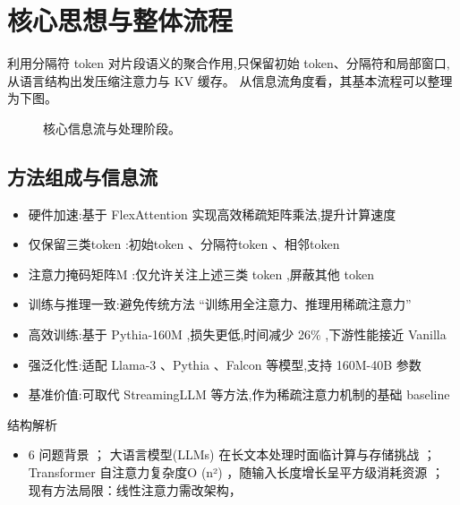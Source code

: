 \documentclass[UTF8,11pt,a4paper]{ctexart}
\begin{document}
\section{核心思想与整体流程}
利用分隔符 token 对片段语义的聚合作用,只保留初始 token、分隔符和局部窗口,从语言结构出发压缩注意力与 KV 缓存。 从信息流角度看，其基本流程可以整理为下图。

\begin{figure}[H]
\centering
{}
\caption{核心信息流与处理阶段。}
\end{figure}

\subsection{方法组成与信息流}
\begin{itemize}
\item 硬件加速:基于 FlexAttention 实现高效稀疏矩阵乘法,提升计算速度
\item 仅保留三类token :初始token 、分隔符token 、相邻token
\item 注意力掩码矩阵M :仅允许关注上述三类 token ,屏蔽其他 token
\item 训练与推理一致:避免传统方法 “训练用全注意力、推理用稀疏注意力”
\item 高效训练:基于 Pythia-160M ,损失更低,时间减少 26\% ,下游性能接近 Vanilla
\item 强泛化性:适配 Llama-3 、Pythia 、Falcon 等模型,支持 160M-40B 参数
\item 基准价值:可取代 StreamingLLM 等方法,作为稀疏注意力机制的基础 baseline
\end{itemize}

\begin{keybox}{结构解析}
\begin{itemize}
\item 6 问题背景 ； 大语言模型(LLMs) 在长文本处理时面临计算与存储挑战 ； Transformer 自注意力复杂度O (n²) ，随输入长度增长呈平方级消耗资源 ； 现有方法局限：线性注意力需改架构，
\end{itemize}
\end{keybox}
\end{document}
